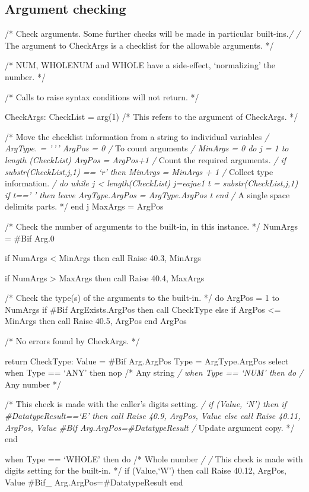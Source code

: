 \hypertarget{argument-checking}{%
\subsection{Argument checking}\label{argument-checking}}

/* Check arguments. Some further checks will be made in particular
built-ins.\emph{/ /} The argument to CheckArgs is a checklist for the
allowable arguments. */

/* NUM, WHOLENUM and WHOLE have a side-effect, `normalizing' the number.
*/

/* Calls to raise syntax conditions will not return. */

CheckArgs: CheckList = arg(1) /* This refers to the argument of
CheckArgs. */

/* Move the checklist information from a string to individual variables
\emph{/ ArgType. = '\,'\,' ArgPos = 0 /} To count arguments \emph{/
MinArgs = 0 do j = 1 to length (CheckList) ArgPos = ArgPos+1 /} Count
the required arguments. \emph{/ if substr(CheckList,j,1) == `r' then
MinArgs = MinArgs + 1 /} Collect type information. \emph{/ do while j
\textless{} length(CheckList) j=eajae1 t = substr(CheckList,j,1) if t=='
' then leave ArgType.ArgPos = ArgType.ArgPos \textbar\textbar{} t end /}
A single space delimits parts. */ end j MaxArgs = ArgPos

/* Check the number of arguments to the built-in, in this instance. */
NumArgs = \#Bif Arg.0

if NumArgs \textless{} MinArgs then call Raise 40.3, MinArgs

if NumArgs \textgreater{} MaxArgs then call Raise 40.4, MaxArgs

/* Check the type(s) of the arguments to the built-in. */ do ArgPos = 1
to NumArgs if \#Bif ArgExists.ArgPos then call CheckType else if ArgPos
\textless= MinArgs then call Raise 40.5, ArgPos end ArgPos

/* No errors found by CheckArgs. */

return CheckType: Value = \#Bif Arg.ArgPos Type = ArgType.ArgPos select
when Type == `ANY' then nop /* Any string \emph{/ when Type == `NUM'
then do /} Any number */

/* This check is made with the caller's digits setting. \emph{/ if
\Cdatatype(Value, `N') then if \#DatatypeResult==`E' then call Raise
40.9, ArgPos, Value else call Raise 40.11, ArgPos, Value \#Bif
Arg.ArgPos=\#DatatypeResult /} Update argument copy. */ end

when Type == `WHOLE' then do /* Whole number \emph{/ /} This check is
made with digits setting for the built-in. */ if \Edatatype(Value,`W')
then call Raise 40.12, ArgPos, Value \#Bif\_ Arg.ArgPos=\#DatatypeResult
end

